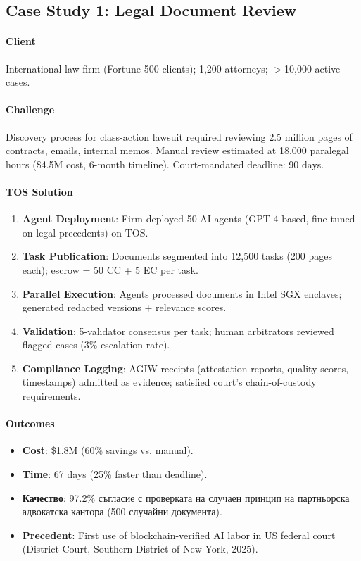 \documentclass[11pt]{article}
\begin{document}
\subsection{Case Study 1: Legal Document Review}

\paragraph{Client} International law firm (Fortune 500 clients); 1,200 attorneys; $>$10,000 active cases.

\paragraph{Challenge} Discovery process for class-action lawsuit required reviewing 2.5 million pages of contracts, emails, internal memos. Manual review estimated at 18,000 paralegal hours (\$4.5M cost, 6-month timeline). Court-mandated deadline: 90 days.

\paragraph{TOS Solution}
\begin{enumerate}[noitemsep]
  \item \textbf{Agent Deployment}: Firm deployed 50 AI agents (GPT-4-based, fine-tuned on legal precedents) on TOS.
  \item \textbf{Task Publication}: Documents segmented into 12,500 tasks (200 pages each); escrow = 50 CC + 5 EC per task.
  \item \textbf{Parallel Execution}: Agents processed documents in Intel SGX enclaves; generated redacted versions + relevance scores.
  \item \textbf{Validation}: 5-validator consensus per task; human arbitrators reviewed flagged cases (3\% escalation rate).
  \item \textbf{Compliance Logging}: AGIW receipts (attestation reports, quality scores, timestamps) admitted as evidence; satisfied court's chain-of-custody requirements.
\end{enumerate}

\paragraph{Outcomes}
\begin{itemize}[noitemsep]
  \item \textbf{Cost}: \$1.8M (60\% savings vs. manual).
  \item \textbf{Time}: 67 days (25\% faster than deadline).
  \item \textbf{Качество}: 97.2\% съгласие с проверката на случаен принцип на партньорска адвокатска кантора (500 случайни документа).
  \item \textbf{Precedent}: First use of blockchain-verified AI labor in US federal court (District Court, Southern District of New York, 2025).
\end{itemize}
\end{document}
